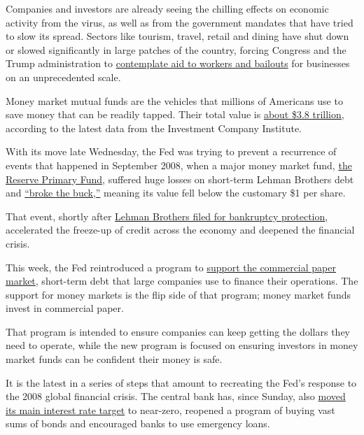 Companies and investors are already seeing the chilling effects on
economic activity from the virus, as well as from the government
mandates that have tried to slow its spread. Sectors like tourism,
travel, retail and dining have shut down or slowed significantly in
large patches of the country, forcing Congress and the Trump
administration to
\href{https://www.nytimes3xbfgragh.onion/2020/03/18/business/bailout-economy-coronavirus.html}{contemplate
aid to workers and bailouts} for businesses on an unprecedented scale.

Money market mutual funds are the vehicles that millions of Americans
use to save money that can be readily tapped. Their total value is
\href{https://ici.org/research/stats/mmf/mm_03_12_20}{about \$3.8
trillion,} according to the latest data from the Investment Company
Institute.

With its move late Wednesday, the Fed was trying to prevent a recurrence
of events that happened in September 2008, when a major money market
fund,
\href{https://dealbook.nytimes3xbfgragh.onion/2008/09/17/money-market-fund-says-customers-could-lose-money/}{the
Reserve Primary Fund}, suffered huge losses on short-term Lehman
Brothers debt and
\href{https://www.nytimes3xbfgragh.onion/2008/09/18/business/yourmoney/18money.html}{``broke
the buck,''} meaning its value fell below the customary \$1 per share.

That event, shortly after
\href{https://www.nytimes3xbfgragh.onion/2008/09/15/business/15lehman.html}{Lehman
Brothers filed for bankruptcy protection}, accelerated the freeze-up of
credit across the economy and deepened the financial crisis.

This week, the Fed reintroduced a program to
\href{https://www.nytimes3xbfgragh.onion/2020/03/17/business/economy/federal-reserve-coronavirus.html}{support
the commercial paper market}, short-term debt that large companies use
to finance their operations. The support for money markets is the flip
side of that program; money market funds invest in commercial paper.

That program is intended to ensure companies can keep getting the
dollars they need to operate, while the new program is focused on
ensuring investors in money market funds can be confident their money is
safe.

It is the latest in a series of steps that amount to recreating the
Fed's response to the 2008 global financial crisis. The central bank
has, since Sunday, also
\href{https://www.nytimes3xbfgragh.onion/2020/03/15/business/economy/federal-reserve-coronavirus.html}{moved
its main interest rate target} to near-zero, reopened a program of
buying vast sums of bonds and encouraged banks to use emergency loans.

